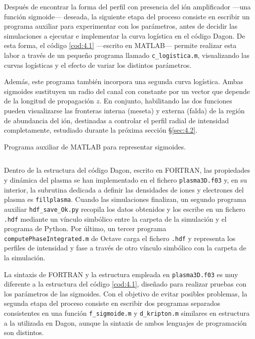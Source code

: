 Después de encontrar la forma del perfil con presencia del ión amplificador ---una función sigmoide--- deseada, la siguiente etapa del proceso consiste en escribir un programa auxiliar para experimentar con los parámetros, antes de decidir las simulaciones a ejecutar e implementar la curva logística en el código Dagon. De esta forma, el código \ref{cod:4.1} ---escrito en MATLAB--- permite realizar esta labor a través de un pequeño programa llamado \texttt{c\_logistica.m}, visualizando las curvas logísticas y el efecto de variar los distintos parámetros.

Además, este programa también incorpora una segunda curva logística. Ambas sigmoides sustituyen un radio del canal con  constante por un vector que depende de la longitud de propagación $z$. En conjunto, habilitando las dos funciones pueden visualizarse las fronteras interna (meseta) y externa (falda) de la región de abundancia del ión, destinadas a controlar el perfil radial de intensidad completamente, estudiado durante la próxima sección \S\ref{sec:4.2}.

\begin{listing}[htbp]
  \caption{Programa auxiliar de MATLAB para representar sigmoides.}
  \inputminted[firstline=1, lastline=38]{matlab}{Programas/c_logistica.m}
  \label{cod:4.1}
\end{listing}

Dentro de la estructura del código Dagon, escrito en FORTRAN, las propiedades y dinámica del plasma se han implementado en el fichero \texttt{plasma3D.f03} y, en su interior, la subrutina dedicada a definir las densidades de iones y electrones del plasma es \texttt{fillplasma}. Cuando las simulaciones finalizan, un segundo programa auxiliar \texttt{hdf\_save\_Ok.py} recopila los datos obtenidos y los escribe en un fichero \texttt{.hdf} mediante un vínculo simbólico entre la carpeta de la simulación y el programa de Python. Por último, un tercer programa \texttt{computePhaseIntegrated.m} de Octave carga el fichero \texttt{.hdf} y representa los perfiles de intensidad y fase a través de otro vínculo simbólico con la carpeta de la simulación.

La sintaxis de FORTRAN y la estructura empleada en \texttt{plasma3D.f03} es muy diferente a la estructura del código \ref{cod:4.1}, diseñado para realizar pruebas con los parámetros de las sigmoides. Con el objetivo de evitar posibles problemas, la segunda etapa del proceso consiste en escribir dos programas separados consistentes en una función \texttt{f\_sigmoide.m} y \texttt{d\_kripton.m} similares en estructura a la utilizada en Dagon, aunque la sintaxis de ambos lenguajes de programación son distintos. 

